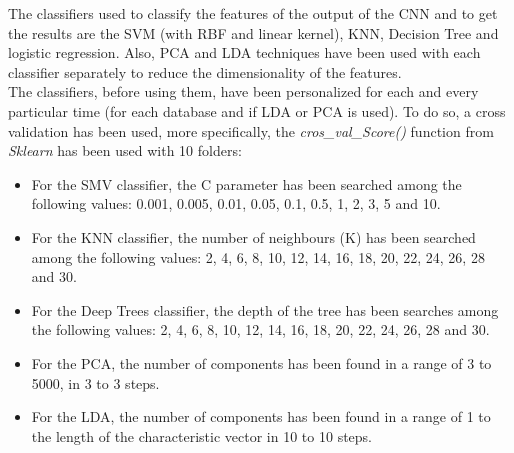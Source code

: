 


The classifiers used to classify the features of the output of the CNN and to get the results are the SVM (with RBF and linear kernel), KNN, Decision Tree and logistic regression. Also, PCA and LDA techniques have been used with each classifier separately to reduce the dimensionality of the features.\\

The classifiers, before using them, have been personalized for each and every particular time (for each database and if LDA or PCA is used). To do so, a cross validation has been used, more specifically, the \textit{cros\_val\_Score()} function from \textit{Sklearn} has been used with 10 folders:\\

\begin{itemize}
\item For the SMV classifier, the C parameter has been searched among the following values: 0.001, 0.005, 0.01, 0.05, 0.1, 0.5, 1, 2, 3, 5 and 10.
\item For the KNN classifier, the number of neighbours (K) has been searched among the following values: 2, 4, 6, 8, 10, 12, 14, 16, 18, 20, 22, 24, 26, 28 and 30.
\item For the Deep Trees classifier, the depth of the tree has been searches among the following values: 2, 4, 6, 8, 10, 12, 14, 16, 18, 20, 22, 24, 26, 28 and 30.
\item For the PCA, the number of components has been found in a range of 3 to 5000, in 3 to 3 steps.
\item For the LDA, the number of components has been found in a range of 1 to the length of the characteristic vector in 10 to 10 steps.
\end{itemize}

